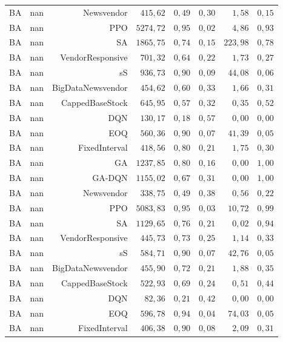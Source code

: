 \begin{table}[htb]
\begin{tabular}{llrrrrrr}
BA & nan & Newsvendor & $415{,}62$ & $0{,}49$ & $0{,}30$ & $1{,}58$ & $0{,}15$ \\
BA & nan & PPO & $5274{,}72$ & $0{,}95$ & $0{,}02$ & $4{,}86$ & $0{,}93$ \\
BA & nan & SA & $1865{,}75$ & $0{,}74$ & $0{,}15$ & $223{,}98$ & $0{,}78$ \\
BA & nan & VendorResponsive & $701{,}32$ & $0{,}64$ & $0{,}22$ & $1{,}73$ & $0{,}27$ \\
BA & nan & sS & $936{,}73$ & $0{,}90$ & $0{,}09$ & $44{,}08$ & $0{,}06$ \\
BA & nan & BigDataNewsvendor & $454{,}62$ & $0{,}60$ & $0{,}33$ & $1{,}66$ & $0{,}31$ \\
BA & nan & CappedBaseStock & $645{,}95$ & $0{,}57$ & $0{,}32$ & $0{,}35$ & $0{,}52$ \\
BA & nan & DQN & $130{,}17$ & $0{,}18$ & $0{,}57$ & $0{,}00$ & $0{,}00$ \\
BA & nan & EOQ & $560{,}36$ & $0{,}90$ & $0{,}07$ & $41{,}39$ & $0{,}05$ \\
BA & nan & FixedInterval & $418{,}56$ & $0{,}80$ & $0{,}21$ & $1{,}75$ & $0{,}30$ \\
BA & nan & GA & $1237{,}85$ & $0{,}80$ & $0{,}16$ & $0{,}00$ & $1{,}00$ \\
BA & nan & GA-DQN & $1155{,}02$ & $0{,}67$ & $0{,}31$ & $0{,}00$ & $1{,}00$ \\
BA & nan & Newsvendor & $338{,}75$ & $0{,}49$ & $0{,}38$ & $0{,}56$ & $0{,}22$ \\
BA & nan & PPO & $5083{,}83$ & $0{,}95$ & $0{,}03$ & $10{,}72$ & $0{,}99$ \\
BA & nan & SA & $1129{,}65$ & $0{,}76$ & $0{,}21$ & $0{,}02$ & $0{,}94$ \\
BA & nan & VendorResponsive & $445{,}73$ & $0{,}73$ & $0{,}25$ & $1{,}14$ & $0{,}33$ \\
BA & nan & sS & $584{,}71$ & $0{,}90$ & $0{,}07$ & $42{,}76$ & $0{,}05$ \\
BA & nan & BigDataNewsvendor & $455{,}90$ & $0{,}72$ & $0{,}21$ & $1{,}88$ & $0{,}35$ \\
BA & nan & CappedBaseStock & $522{,}93$ & $0{,}69$ & $0{,}24$ & $0{,}51$ & $0{,}44$ \\
BA & nan & DQN & $82{,}36$ & $0{,}21$ & $0{,}42$ & $0{,}00$ & $0{,}00$ \\
BA & nan & EOQ & $596{,}78$ & $0{,}94$ & $0{,}04$ & $74{,}03$ & $0{,}05$ \\
BA & nan & FixedInterval & $406{,}38$ & $0{,}90$ & $0{,}08$ & $2{,}09$ & $0{,}31$ \\

\end{tabular}
\end{table}
